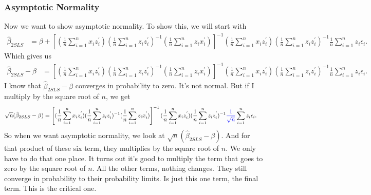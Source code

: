 \documentclass[11pt,a4paper]{amsart}
\theoremstyle{plain}
\theoremstyle{definition}
\begin{document}
\subsubsection{Asymptotic Normality}
 	 Now we want to show asymptotic normality. To show this, we will start with 
 	 \[	\begin{aligned}
	 	  \hat{\beta}_{2SLS}  &=	\beta + \left[(\frac{1}{n}\sum_{i=1}^{n}x_{i}z^{'}_{i})(\frac{1}{n}\sum_{i=1}^{n}z_{i}z^{'}_{i})^{-1}(\frac{1}{n}\sum_{i=1}^{n}z_{i}x^{'}_{i})\right]^{-1} (\frac{1}{n}\sum_{i=1}^{n}x_{i}z^{'}_{i})(\frac{1}{n}\sum_{i=1}^{n}z_{i}z^{'}_{i})^{-1}\frac{1}{n}\sum_{i=1}^{n}z_{i}\epsilon_{i}.
 	 \end{aligned}
 		\]
 		Which gives us 
 			 \[	\begin{aligned}
 		\hat{\beta}_{2SLS} - \beta &= \left[(\frac{1}{n}\sum_{i=1}^{n}x_{i}z^{'}_{i})(\frac{1}{n}\sum_{i=1}^{n}z_{i}z^{'}_{i})^{-1}(\frac{1}{n}\sum_{i=1}^{n}z_{i}x^{'}_{i})\right]^{-1} (\frac{1}{n}\sum_{i=1}^{n}x_{i}z^{'}_{i})(\frac{1}{n}\sum_{i=1}^{n}z_{i}z^{'}_{i})^{-1}\frac{1}{n}\sum_{i=1}^{n}z_{i}\epsilon_{i}.
 		\end{aligned}
 		\]
 		I know that $\hat{\beta}_{2SLS} - \beta $ converges in probability to zero. It's not normal. But if I multiply by the square root of $n$, we get 
 			 \[	\begin{aligned}
 		\sqrt{n}(\hat{\beta}_{2SLS} - \beta) &= \left[(\frac{1}{n}\sum_{i=1}^{n}x_{i}z^{'}_{i})(\frac{1}{n}\sum_{i=1}^{n}z_{i}z^{'}_{i})^{-1}(\frac{1}{n}\sum_{i=1}^{n}z_{i}x^{'}_{i})\right]^{-1} (\frac{1}{n}\sum_{i=1}^{n}x_{i}z^{'}_{i})(\frac{1}{n}\sum_{i=1}^{n}z_{i}z^{'}_{i})^{-1}\textcolor{blue}{\frac{1}{\sqrt{n}}}\sum_{i=1}^{n}z_{i}\epsilon_{i}.
 		\end{aligned}
 		\]
 		So when we want asymptotic normality, we look at $\sqrt{n}(\hat{\beta}_{2SLS} - \beta) $. And for that product of these six term, they multiplies by the square root of $n$. We only have to do that one place. It turns out it's good to multiply the term that goes to zero by the square root of $n$. All the other terms, nothing changes. They still converge in probability to their probability limits. Is just this one term, the final term. This is the critical one. \par 
\end{document}
